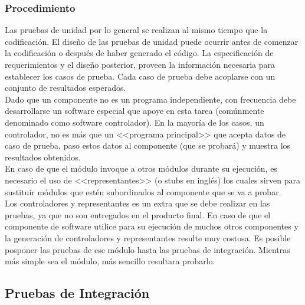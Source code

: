 \subsubsection{Procedimiento}
Las pruebas de unidad por lo general se realizan al mismo tiempo que la codificación. El diseño de las pruebas de unidad puede ocurrir antes de comenzar la codificación o después de haber generado el código. La especificación de requerimientos y el diseño posterior, proveen la información necesaria para establecer los casos de prueba. Cada caso de prueba debe acoplarse con un conjunto de resultados esperados.\\
Dado que un componente no es un programa independiente, con frecuencia debe desarrollarse un software especial que apoye en esta tarea (comúnmente denominado como software controlador). En la mayoría de los casos, un controlador, no es más que un <<programa principal>> que acepta datos de caso de prueba, paso estos datos al componente (que se probará) y muestra los resultados obtenidos.\\ En caso de que el módulo invoque a otros módulos durante su ejecución, es necesario el uso de <<representantes>> (o stubs en inglés) los cuales sirven para sustituir módulos que estén subordinados al componente que se va a probar.\\
Los controladores y representantes es un extra que se debe realizar en las pruebas, ya que no son entregados en el producto final. En caso de que el componente de software utilice para su ejecución de muchos otros componentes y la generación de controladores y representantes resulte muy costosa. Es posible posponer las pruebas de ese módulo hasta las pruebas de integración. Mientras más simple sea el módulo, más sencillo resultara probarlo.
\subsection{Pruebas de Integración}
